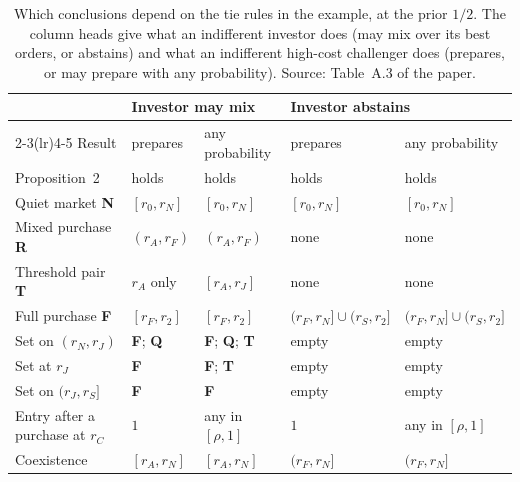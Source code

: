 \begin{table}[htbp]
\centering\small
\setlength{\tabcolsep}{4pt}
\begin{tabular}{@{}lllll@{}}
\toprule
 & \multicolumn{2}{l}{Investor may mix} & \multicolumn{2}{l}{Investor abstains}\\
\cmidrule(lr){2-3}\cmidrule(lr){4-5}
Result & prepares & any probability & prepares & any probability\\
\midrule
Proposition~2 & holds & holds & holds & holds\\
Quiet market \textbf{N} & \([r_0,r_N]\) & \([r_0,r_N]\) & \([r_0,r_N]\) & \([r_0,r_N]\)\\
Mixed purchase \textbf{R} & \((r_A,r_F)\) & \((r_A,r_F)\) & none & none\\
Threshold pair \textbf{T} & \(r_A\) only & \([r_A,r_J]\) & none & none\\
Full purchase \textbf{F} & \([r_F,r_2]\) & \([r_F,r_2]\) & \((r_F,r_N]\cup(r_S,r_2]\) & \((r_F,r_N]\cup(r_S,r_2]\)\\
Set on \((r_N,r_J)\) & \textbf{F}; \textbf{Q} & \textbf{F}; \textbf{Q}; \textbf{T} & empty & empty\\
Set at \(r_J\) & \textbf{F} & \textbf{F}; \textbf{T} & empty & empty\\
Set on \((r_J,r_S]\) & \textbf{F} & \textbf{F} & empty & empty\\
Entry after a purchase at \(r_C\) & \(1\) & any in \([\rho,1]\) & \(1\) & any in \([\rho,1]\)\\
Coexistence & \([r_A,r_N]\) & \([r_A,r_N]\) & \((r_F,r_N]\) & \((r_F,r_N]\)\\
\bottomrule
\end{tabular}
\caption{Which conclusions depend on the tie rules in the example, at the prior \(1/2\). The column heads give what an
indifferent investor does (may mix over its best orders, or abstains) and what an indifferent high-cost challenger
does (prepares, or may prepare with any probability). Source: Table~A.3 of the paper.}
\label{tab:coexistence-ties}
\end{table}

